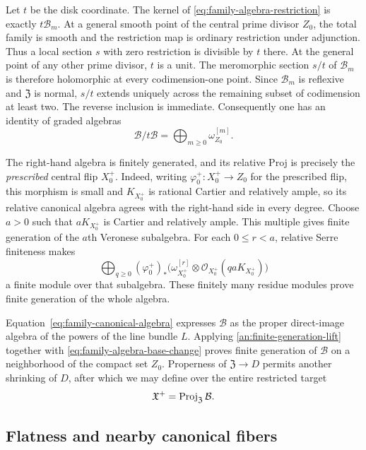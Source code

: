 \documentclass[11pt,a4paper]{article}
\theoremstyle{definition}\newtheorem{definition}[theorem]{Definition}
\theoremstyle{remark}\newtheorem*{remark}{Remark}
\newcommand{\OO}{\mathcal O}
\begin{document}
Let $t$ be the disk coordinate. The kernel of
\eqref{eq:family-algebra-restriction} is exactly $t\mathcal B_m$.
At a general smooth point of the central prime divisor $Z_0$,
the total family is smooth and the restriction map is ordinary
restriction under adjunction. Thus a local section $s$ with zero restriction
is divisible by $t$ there. At the general point of any other prime
divisor, $t$ is a unit. The meromorphic section $s/t$ of $\mathcal B_m$
is therefore holomorphic at every codimension-one point.
Since $\mathcal B_m$ is reflexive and $\mathfrak Z$ is normal,
$s/t$ extends uniquely across
the remaining subset of codimension at least two. The reverse
inclusion is immediate. Consequently one has an identity of
graded algebras
\begin{equation}\label{eq:family-algebra-base-change}
 \mathcal B/t\mathcal B
 =\bigoplus_{m\ge0}\omega_{Z_0}^{[m]}.
\end{equation}

The right-hand algebra is finitely generated, and its relative
Proj is precisely the \emph{prescribed} central flip $X_0^+$.
Indeed, writing $\varphi_0^+:X_0^+\to Z_0$ for the prescribed flip,
this morphism is small and $K_{X_0^+}$ is rational
Cartier and relatively ample, so its relative canonical algebra
agrees with the right-hand side in every degree. Choose $a>0$ such that
$aK_{X_0^+}$ is Cartier and relatively ample. This multiple gives
finite generation of the $a$th Veronese subalgebra.
For each $0\le r<a$, relative Serre finiteness makes
\[
 \bigoplus_{q\ge0}(\varphi_0^+)_*
 \bigl(\omega_{X_0^+}^{[r]}\otimes
 \OO_{X_0^+}(qaK_{X_0^+})\bigr)
\]
a finite module over that subalgebra. These finitely many residue
modules prove finite generation of the whole algebra.

Equation~\eqref{eq:family-canonical-algebra} expresses
$\mathcal B$ as the proper direct-image algebra of the powers
of the line bundle $L$. Applying \ref{an:finite-generation-lift}
together with \eqref{eq:family-algebra-base-change} proves
finite generation of $\mathcal B$ on a neighborhood of the
compact set $Z_0$. Properness of $\mathfrak Z\to D$ permits
another shrinking of $D$, after which we may define over the
entire restricted target
\begin{equation}\label{eq:total-flip-Proj}
 \mathfrak X^+=\operatorname{Proj}_{\mathfrak Z}\mathcal B.
\end{equation}

\subsection{Flatness and nearby canonical fibers}
\end{document}
